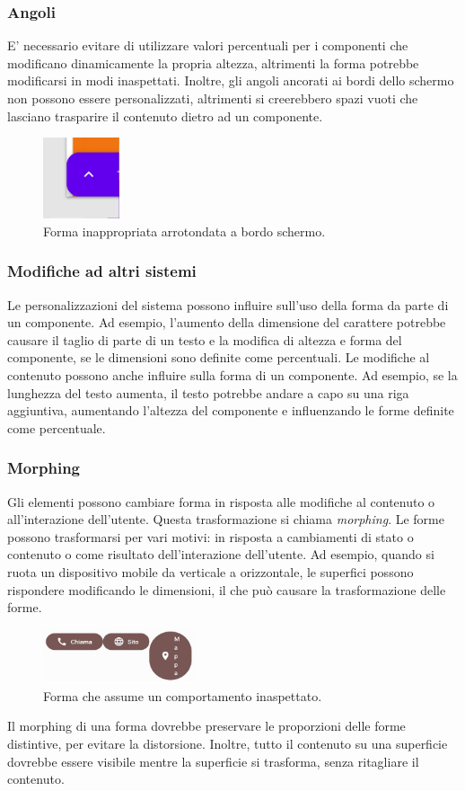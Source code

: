 \documentclass[12pt, a4paper]{report}
\begin{document}
	\subsubsection{Angoli}
	E' necessario evitare di utilizzare valori percentuali per i componenti che modificano dinamicamente la propria altezza, altrimenti la forma potrebbe modificarsi in modi inaspettati.
	Inoltre, gli angoli ancorati ai bordi dello schermo non possono essere personalizzati, altrimenti si creerebbero spazi vuoti che lasciano trasparire il contenuto dietro ad un componente.
	\begin{figure}[h]
		\centering
		\includegraphics[width=0.2\textwidth]{erroreshape} %
		\caption{Forma inappropriata arrotondata a bordo schermo.}
	\end{figure}
	\subsubsection{Modifiche ad altri sistemi}
	Le personalizzazioni del sistema possono influire sull'uso della forma da parte di un componente. Ad esempio, l'aumento della dimensione del carattere potrebbe causare il taglio di parte di un testo e la modifica di altezza e forma del componente, se le dimensioni sono definite come percentuali.
	Le modifiche al contenuto possono anche influire sulla forma di un componente. Ad esempio, se la lunghezza del testo aumenta, il testo potrebbe andare a capo su una riga aggiuntiva, aumentando l'altezza del componente e influenzando le forme definite come percentuale.
	\subsubsection{Morphing}
	Gli elementi possono cambiare forma in risposta alle modifiche al contenuto o all'interazione dell'utente. Questa trasformazione si chiama \textit{morphing}. Le forme possono trasformarsi per vari motivi: in risposta a cambiamenti di stato o contenuto o come risultato dell'interazione dell'utente. Ad esempio, quando si ruota un
	dispositivo mobile da verticale a orizzontale, le superfici possono rispondere modificando le dimensioni, il che può causare la trasformazione delle forme.
	\begin{figure}[h]
		\centering
		\includegraphics[width=0.4\textwidth]{erroreForme} %
		\caption{Forma che assume un comportamento inaspettato.}
	\end{figure}
	Il morphing di una forma dovrebbe preservare le proporzioni delle forme distintive, per evitare la distorsione.
	Inoltre, tutto il contenuto su una superficie dovrebbe essere visibile mentre la superficie si trasforma, senza ritagliare il contenuto.
\end{document}

